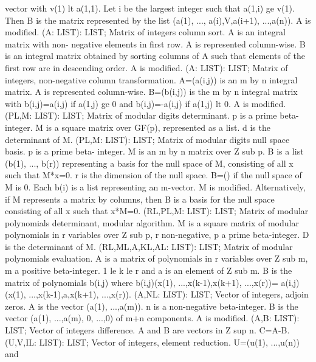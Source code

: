 vector with v(1) lt a(1,1). Let i be the largest integer such that
a(1,i) ge v(1).  Then B is the matrix represented by the list (a(1), ...,
a(i),V,a(i+1), ...,a(n)). A is modified. \ecom 
{} (A: LIST): LIST; \eproc
\bcom Matrix of integers column sort. A is an integral matrix with non-
negative elements in first row.  A is represented column-wise.  B is an
integral matrix obtained by sorting columns of A such that elements
of the first row are in descending order. A is modified. \ecom 
{} (A: LIST): LIST; \eproc
\bcom Matrix of integers, non-negative column transformation.
A=(a(i,j)) is an m by n integral matrix.  A is represented
column-wise. B=(b(i,j)) is the m by n integral matrix
with b(i,j)=a(i,j) if a(1,j) ge 0 and b(i,j)=-a(i,j) if
a(1,j) lt 0. A is modified. \ecom 
{} (PL,M: LIST): LIST; \eproc
\bcom Matrix of modular digits determinant. p is a prime beta-integer.
M is a square matrix over GF(p), represented as a list.  d is the
determinant of M. \ecom 
{} (PL,M: LIST): LIST; \eproc
\bcom Matrix of modular digits null space basis. p is a prime beta-
integer.  M is an m by n matrix over Z sub p.  B is a list (b(1), ...,
b(r)) representing a basis for the null space of M, consisting of all
x such that M*x=0.  r is the dimension of the null space.  B=() if
the null space of M is 0.  Each b(i) is a list representing an
m-vector.  M is modified.  Alternatively, if M represents a matrix by
columns, then B is a basis for the null space consisting of all x such
that x*M=0. \ecom 
{} (RL,PL,M: LIST): LIST; \eproc
\bcom Matrix of modular polynomials determinant, modular algorithm. M is a
square matrix of modular polynomials in r variables over Z sub p,
r non-negative, p a prime beta-integer. D is the determinant of M. \ecom 
{} (RL,ML,A,KL,AL: LIST): LIST; \eproc
\bcom Matrix of modular polynomials evaluation. A is a matrix of
polynomials in r variables over Z sub m, m a positive beta-integer.
1 le k le r and a is an element of Z sub m.  B is the matrix of
polynomials b(i,j) where b(i,j)(x(1), ...,x(k-1),x(k+1), ...,x(r))=
a(i,j)(x(1), ...,x(k-1),a,x(k+1), ...,x(r)). \ecom 
{} (A,NL: LIST): LIST; \eproc
\bcom Vector of integers, adjoin zeros. A is the vector (a(1), ...,a(m)).
n is a non-negative beta-integer.  B is the vector (a(1), ...,a(m),
0, ...,0) of m+n components. A is modified. \ecom 
{} (A,B: LIST): LIST; \eproc
\bcom Vector of integers difference. A and B are vectors in Z sup n.
C=A-B. \ecom 
{} (U,V,IL: LIST): LIST; \eproc
\bcom Vector of integers, element reduction. U=(u(1), ...,u(n)) and
